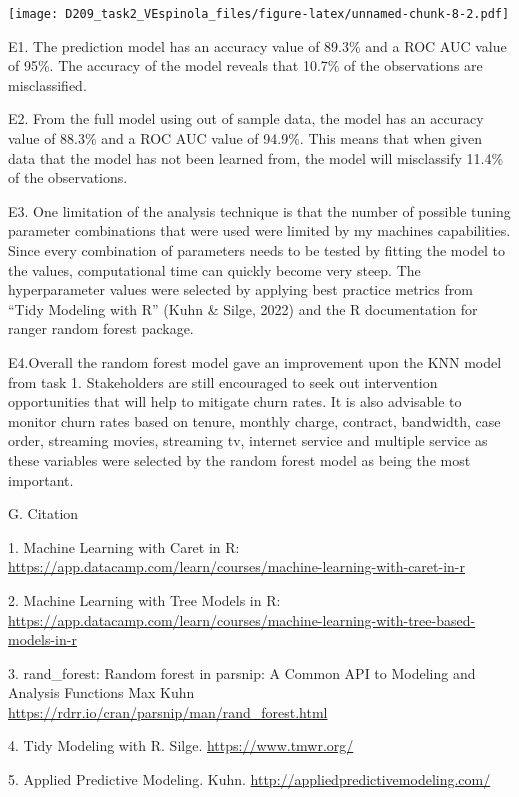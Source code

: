 \documentclass[
]{article}
\begin{document}
\texttt{[image: D209\_task2\_VEspinola\_files/figure-latex/unnamed-chunk-8-2.pdf]}

E1. The prediction model has an accuracy value of 89.3\% and a ROC AUC
value of 95\%. The accuracy of the model reveals that 10.7\% of the
observations are misclassified.

E2. From the full model using out of sample data, the model has an
accuracy value of 88.3\% and a ROC AUC value of 94.9\%. This means that
when given data that the model has not been learned from, the model will
misclassify 11.4\% of the observations.

E3. One limitation of the analysis technique is that the number of
possible tuning parameter combinations that were used were limited by my
machines capabilities. Since every combination of parameters needs to be
tested by fitting the model to the values, computational time can
quickly become very steep. The hyperparameter values were selected by
applying best practice metrics from ``Tidy Modeling with R'' (Kuhn \&
Silge, 2022) and the R documentation for ranger random forest package.

E4.Overall the random forest model gave an improvement upon the KNN
model from task 1. Stakeholders are still encouraged to seek out
intervention opportunities that will help to mitigate churn rates. It is
also advisable to monitor churn rates based on tenure, monthly charge,
contract, bandwidth, case order, streaming movies, streaming tv,
internet service and multiple service as these variables were selected
by the random forest model as being the most important.

G. Citation

1. Machine Learning with Caret in R:
\url{https://app.datacamp.com/learn/courses/machine-learning-with-caret-in-r}

2. Machine Learning with Tree Models in R:
\url{https://app.datacamp.com/learn/courses/machine-learning-with-tree-based-models-in-r}

3. rand\_forest: Random forest in parsnip: A Common API to Modeling and
Analysis Functions Max Kuhn
\url{https://rdrr.io/cran/parsnip/man/rand_forest.html}

4. Tidy Modeling with R. Silge. \url{https://www.tmwr.org/}

5. Applied Predictive Modeling. Kuhn.
\url{http://appliedpredictivemodeling.com/}
\end{document}
